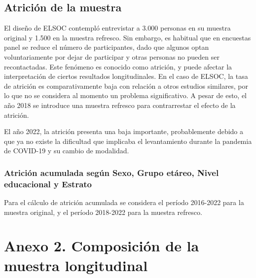 \documentclass[
  12pt,
]{book}
\begin{document}
\hypertarget{atriciuxf3n-de-la-muestra}{%
\subsection*{Atrición de la muestra}\label{atriciuxf3n-de-la-muestra}}

El diseño de ELSOC contempló entrevistar a 3.000 personas en su muestra original y 1.500 en la muestra refresco. Sin embargo, es habitual que en encuestas panel se reduce el número de participantes, dado que algunos optan voluntariamente por dejar de participar y otras personas no pueden ser recontactadas. Este fenómeno es conocido como atrición, y puede afectar la interpretación de ciertos resultados longitudinales. En el caso de ELSOC, la tasa de atrición es comparativamente baja con relación a otros estudios similares, por lo que no se considera al momento un problema significativo. A pesar de esto, el año 2018 se introduce una muestra refresco para contrarrestar el efecto de la atrición.

El año 2022, la atrición presenta una baja importante, probablemente debido a que ya no existe la dificultad que implicaba el levantamiento durante la pandemia de COVID-19 y su cambio de modalidad.

\hypertarget{atriciuxf3n-acumulada-seguxfan-sexo-grupo-etuxe1reo-nivel-educacional-y-estrato}{%
\subsubsection*{Atrición acumulada según Sexo, Grupo etáreo, Nivel educacional y Estrato}\label{atriciuxf3n-acumulada-seguxfan-sexo-grupo-etuxe1reo-nivel-educacional-y-estrato}}

Para el cálculo de atrición acumulada se considera el período 2016-2022 para la muestra original, y el período 2018-2022 para la muestra refresco.

\hypertarget{anexo-2.-composiciuxf3n-de-la-muestra-longitudinal}{%
\section*{Anexo 2. Composición de la muestra longitudinal}\label{anexo-2.-composiciuxf3n-de-la-muestra-longitudinal}}
\end{document}
